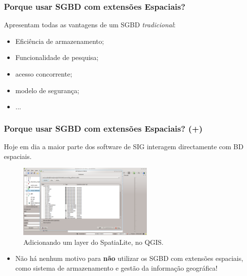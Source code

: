 \documentclass[hyperref={pdfpagelabels=true}]{beamer}
\begin{document}
\begin{frame}
\frametitle{Porque usar SGBD com extens\~{o}es Espaciais?}
Apresentam todas as vantagens de um SGBD \textit{tradicional}:\\
    \begin{itemize}
      \item<2-> Efici\^{e}ncia de armazenamento;
      \item<2-> Funcionalidade de pesquisa;
      \item<2-> acesso concorrente;
      \item<2-> modelo de seguran\c{c}a;
      \item<2-> ...      
    \end{itemize}
\end{frame}

\begin{frame}
\frametitle{Porque usar SGBD com extens\~{o}es Espaciais? (+)}
Hoje em dia a maior parte dos software de SIG interagem directamente com BD espaciais.\\
  \begin{figure}[!ht]%
    \begin{center}
    \includegraphics[width=0.6\textwidth ]{spatialite_layer.png}
      \caption[\tiny{Adicionando um layer do SpatiaLite, no QGIS.}]{\tiny{Adicionando um layer do SpatiaLite, no QGIS.}}
      \label{frame} %
    \end{center}
  \end{figure}    

    \begin{itemize}
      \item<2-> N\~{a}o h\'{a} nenhum motivo para \textbf{n\~{a}o} utilizar os SGBD com extens\~{o}es espaciais, como sistema de armazenamento e gest\~{a}o da informa\c{c}\~{a}o geogr\'{a}fica!
    \end{itemize}  
\end{frame}
\end{document}
